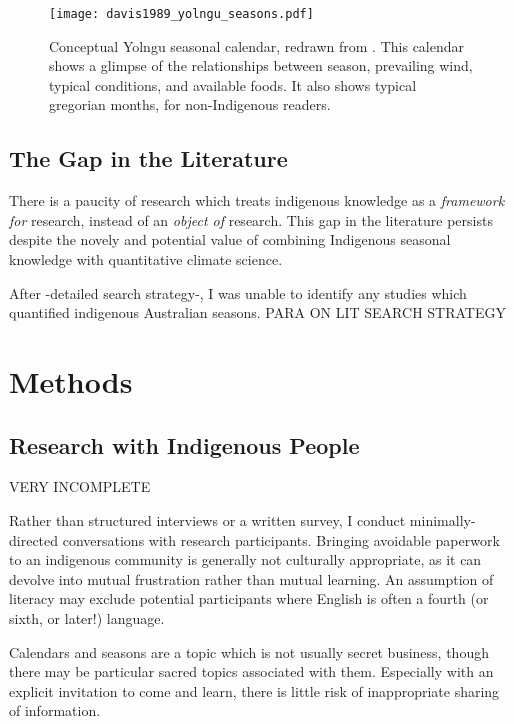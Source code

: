 \begin{figure}[h]
    \centering
    \texttt{[image: davis1989\_yolngu\_seasons.pdf]}
    \caption[Conceptual Yolngu seasonal calendar \citep{davis1989}]{
        Conceptual Yolngu seasonal calendar, redrawn from \citet[p2]{davis1989}.
        This calendar shows a glimpse of the relationships between season,
        prevailing wind, typical conditions, and available foods.
        It also shows typical gregorian months, for non-Indigenous readers.
        }
    \label{fig:yolngu-seasons}
\end{figure}




\subsection{The Gap in the Literature}

There is a paucity of research which treats indigenous knowledge
as a \emph{framework for} research, instead of an \emph{object of} research.
This gap in the literature persists despite the novely and potential value
of combining Indigenous seasonal knowledge with quantitative climate science.

After -detailed search strategy-, I was unable to identify any studies which
quantified indigenous Australian seasons.  PARA ON LIT SEARCH STRATEGY




\section{Methods}
\label{sec:lit-methods}


\subsection{Research with Indigenous People}

VERY INCOMPLETE

Rather than structured interviews or a written survey, I conduct minimally-
directed conversations with research participants.  Bringing avoidable
paperwork to an indigenous community is generally not culturally appropriate,
as it can devolve into mutual frustration rather than mutual learning.  An
assumption of literacy may exclude potential participants where English is
often a fourth (or sixth, or later!) language.

Calendars and seasons are a topic which is not usually secret business, though
there may be particular sacred topics associated with them.  Especially with an
explicit invitation to come and learn, there is little risk of inappropriate
sharing of information.


